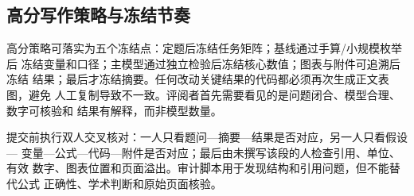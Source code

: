 \subsection{高分写作策略与冻结节奏}

高分策略可落实为五个冻结点：定题后冻结任务矩阵；基线通过手算/小规模枚举后
冻结变量和口径；主模型通过独立检验后冻结核心数值；图表与附件可追溯后冻结
结果；最后才冻结摘要。任何改动关键结果的代码都必须再次生成正文表图，避免
人工复制导致不一致。评阅者首先需要看见的是问题闭合、模型合理、数字可核验和
结果有解释，而非模型数量。

提交前执行双人交叉核对：一人只看题问—摘要—结果是否对应，另一人只看假设—
变量—公式—代码—附件是否对应；最后由未撰写该段的人检查引用、单位、有效
数字、图表位置和页面溢出。审计脚本用于发现结构和引用问题，但不能替代公式
正确性、学术判断和原始页面核验。

